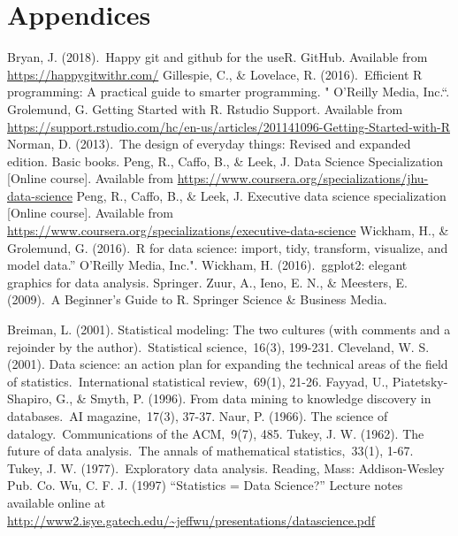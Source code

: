 \documentclass[
]{book}
\begin{document}
\hypertarget{part-appendices}{%
\part*{Appendices}\label{part-appendices}}

Bryan, J. (2018).~Happy git and github for the useR. GitHub. Available from \url{https://happygitwithr.com/}
Gillespie, C., \& Lovelace, R. (2016).~Efficient R programming: A practical guide to smarter programming. " O'Reilly Media, Inc.``.
Grolemund, G. Getting Started with R. Rstudio Support. Available from \url{https://support.rstudio.com/hc/en-us/articles/201141096-Getting-Started-with-R}
Norman, D. (2013).~The design of everyday things: Revised and expanded edition. Basic books.
Peng, R., Caffo, B., \& Leek, J. Data Science Specialization {[}Online course{]}. Available from \url{https://www.coursera.org/specializations/jhu-data-science}
Peng, R., Caffo, B., \& Leek, J. Executive data science specialization {[}Online course{]}. Available from \url{https://www.coursera.org/specializations/executive-data-science}
Wickham, H., \& Grolemund, G. (2016).~R for data science: import, tidy, transform, visualize, and model data.'' O'Reilly Media, Inc.".
Wickham, H. (2016).~ggplot2: elegant graphics for data analysis. Springer.
Zuur, A., Ieno, E. N., \& Meesters, E. (2009).~A Beginner's Guide to R. Springer Science \& Business Media.

Breiman, L. (2001). Statistical modeling: The two cultures (with comments and a rejoinder by the author).~Statistical science,~16(3), 199-231.
Cleveland, W. S. (2001). Data science: an action plan for expanding the technical areas of the field of statistics.~International statistical review,~69(1), 21-26.
Fayyad, U., Piatetsky-Shapiro, G., \& Smyth, P. (1996). From data mining to knowledge discovery in databases.~AI magazine,~17(3), 37-37.
Naur, P. (1966). The science of datalogy.~Communications of the ACM,~9(7), 485.
Tukey, J. W. (1962). The future of data analysis.~The annals of mathematical statistics,~33(1), 1-67.
Tukey, J. W. (1977).~Exploratory data analysis. Reading, Mass: Addison-Wesley Pub. Co.
Wu, C. F. J. (1997) ``Statistics = Data Science?'' Lecture notes available online at \url{http://www2.isye.gatech.edu/~jeffwu/presentations/datascience.pdf}

  
\end{document}
